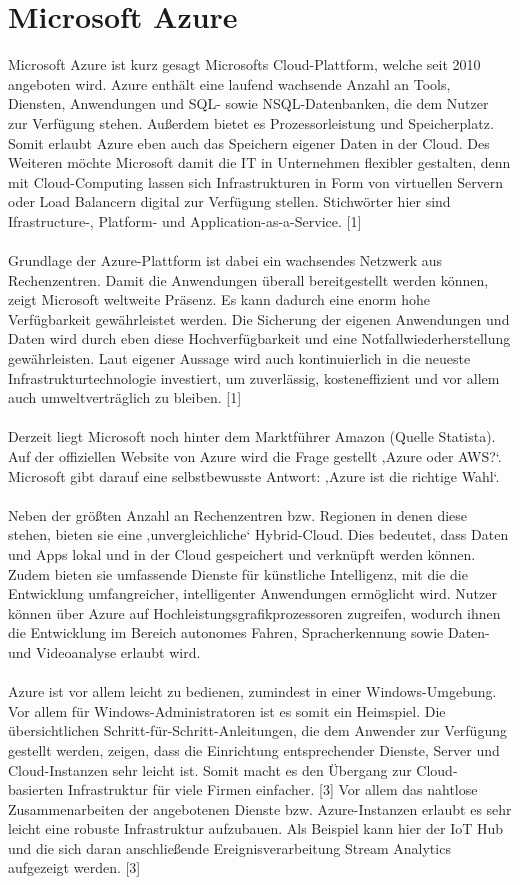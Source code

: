 \section{Microsoft Azure}
Microsoft Azure ist kurz gesagt Microsofts Cloud-Plattform, welche seit 2010 angeboten wird. Azure enthält eine laufend wachsende Anzahl an Tools, Diensten, Anwendungen und SQL- sowie NSQL-Datenbanken, die dem Nutzer zur Verfügung stehen. Außerdem bietet es Prozessorleistung und Speicherplatz. Somit erlaubt Azure eben auch das Speichern eigener Daten in der Cloud. Des Weiteren möchte Microsoft damit die IT in Unternehmen flexibler gestalten, denn mit Cloud-Computing lassen sich Infrastrukturen in Form von virtuellen Servern oder Load Balancern digital zur Verfügung stellen. Stichwörter hier sind Ifrastructure-, Platform- und Application-as-a-Service. [1]\\ \\
Grundlage der Azure-Plattform ist dabei ein wachsendes Netzwerk aus Rechenzentren. Damit die Anwendungen überall bereitgestellt werden können, zeigt Microsoft weltweite Präsenz. Es kann dadurch eine enorm hohe Verfügbarkeit gewährleistet werden. Die Sicherung der eigenen Anwendungen und Daten wird durch eben diese Hochverfügbarkeit und eine Notfallwiederherstellung gewährleisten. Laut eigener Aussage wird auch kontinuierlich in die neueste Infrastrukturtechnologie investiert, um zuverlässig, kosteneffizient und vor allem auch umweltverträglich zu bleiben. [1]\\ \\
Derzeit liegt Microsoft noch hinter dem Marktführer Amazon (Quelle Statista). Auf der offiziellen Website von Azure wird die Frage gestellt ‚Azure oder AWS?‘. Microsoft gibt darauf eine selbstbewusste Antwort: ‚Azure ist die richtige Wahl‘.\\ \\ 
Neben der größten Anzahl an Rechenzentren bzw. Regionen in denen diese stehen, bieten sie eine ‚unvergleichliche‘ Hybrid-Cloud. Dies bedeutet, dass Daten und Apps lokal und in der Cloud gespeichert und verknüpft werden können. Zudem bieten sie umfassende Dienste für künstliche Intelligenz, mit die die Entwicklung umfangreicher, intelligenter Anwendungen ermöglicht wird. Nutzer können über Azure auf Hochleistungsgrafikprozessoren zugreifen, wodurch ihnen die Entwicklung im Bereich autonomes Fahren, Spracherkennung sowie Daten- und Videoanalyse erlaubt wird.\\ \\
Azure ist vor allem leicht zu bedienen, zumindest in einer Windows-Umgebung. Vor allem für Windows-Administratoren ist es somit ein Heimspiel. Die übersichtlichen Schritt-für-Schritt-Anleitungen, die dem Anwender zur Verfügung gestellt werden, zeigen, dass die Einrichtung entsprechender Dienste, Server und Cloud-Instanzen sehr leicht ist. Somit macht es den Übergang zur Cloud-basierten Infrastruktur für viele Firmen einfacher. [3] Vor allem das nahtlose Zusammenarbeiten der angebotenen Dienste bzw. Azure-Instanzen erlaubt es sehr leicht eine robuste Infrastruktur aufzubauen. Als Beispiel kann hier der IoT Hub und die sich daran anschließende Ereignisverarbeitung Stream Analytics aufgezeigt werden. [3]\\ \\
